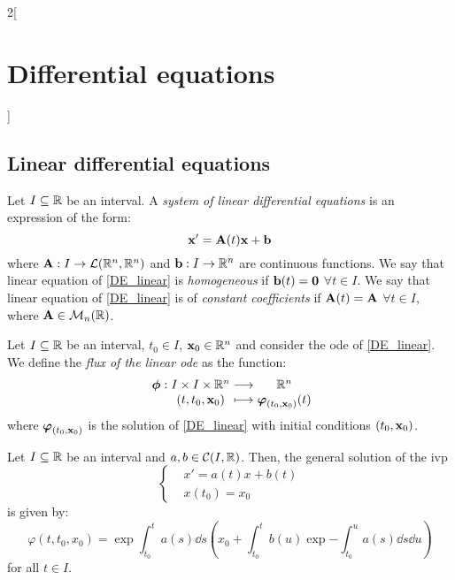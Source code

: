 \documentclass[../../../main.tex]{subfiles}
\begin{document}
\begin{multicols}{2}[\section{Differential equations}]
  \subsection{Linear differential equations}
  \begin{definition}
    Let $I\subseteq\mathbb{R}$ be an interval. A \textit{system of linear differential equations} is an expression of the form:
    \begin{equation}\label{DE_linear}
      \boldsymbol{\mathrm{x}}'=\boldsymbol{\mathrm{A}}(t)\boldsymbol{\mathrm{x}}+\boldsymbol{\mathrm{b}}
    \end{equation}
    where $\boldsymbol{\mathrm{A}}:I\rightarrow\mathcal{L}(\mathbb{R}^n,\mathbb{R}^n)$ and $\boldsymbol{\mathrm{b}}:I\rightarrow\mathbb{R}^n$ are continuous functions.
    We say that linear equation of \cref{DE_linear} is \textit{homogeneous} if $\boldsymbol{\mathrm{b}}(t)=\boldsymbol{\mathrm{0}}$ $\forall t\in I$. We say that linear equation of \cref{DE_linear} is of \textit{constant coefficients} if $\boldsymbol{\mathrm{A}}(t)=\boldsymbol{\mathrm{A}}$ $\forall t\in I$, where $\boldsymbol{\mathrm{A}}\in\mathcal{M}_n(\mathbb{R})$.
  \end{definition}
  \begin{definition}
    Let $I\subseteq\mathbb{R}$ be an interval, $t_0\in I$, $\boldsymbol{\mathrm{x}}_0\in\mathbb{R}^n$ and consider the ode of \cref{DE_linear}. We define the \textit{flux of the linear ode} as the function:
    $$
      \function{\vectorfunction{\phi}}{I\times I\times \RR^n}{\RR^n}{(t,t_0,\vectorfunction{x}_0)}{\vectorfunction{\varphi}_{(t_0,\vectorfunction{x}_0)}(t)}
    $$
    where $\boldsymbol{\mathrm{\varphi}}_{(t_0,\boldsymbol{\mathrm{x}}_0)}$ is the solution of \cref{DE_linear} with initial conditions $(t_0,\boldsymbol{\mathrm{x}}_0)$.
  \end{definition}
  \begin{prop}
    Let $I\subseteq\mathbb{R}$ be an interval and $a,b\in\mathcal{C}(I,\mathbb{R})$. Then, the general solution of the ivp
    $$\left\{
      \begin{aligned}
         & x'      =a(t)x+b(t) \\
         & x(t_0)  =x_0
      \end{aligned}
      \right.$$
    is given by:
    \begin{equation}\label{DE_sol-lin}
      \varphi(t,t_0,x_0)=\exp{\int_{t_0}^ta(s)\dd s}\left(x_0+\int_{t_0}^tb(u)\exp{-\int_{t_0}^ua(s)\dd s}\dd u\right)
    \end{equation}
    for all $t\in I$.
  \end{prop}

\end{multicols}
\end{document}
